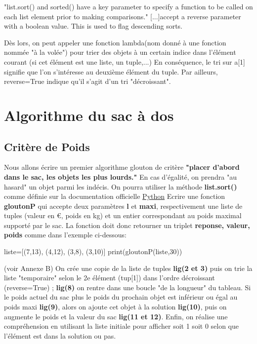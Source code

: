 \documentclass[a4paper,11,answers
]{exam}
\begin{document}
\begin{questions}
\begin{solution}
 "list.sort() and sorted() have a key parameter to specify a function to be called on each list element prior to making comparisons." [...]accept a reverse parameter with a boolean value. This is used to flag descending sorts.\newline

 Dès lors, on peut appeler une fonction lambda(nom donné à une fonction nommée "à la volée") pour trier des objets à un certain indice dans l’élément courant (si cet élément est une liste, un tuple,...) En conséquence, le tri sur a[1] signifie que l’on s’intéresse au deuxième élément du tuple. Par ailleurs, reverse=True indique qu’il s’agit d’un tri "décroissant".

\end{solution}
\section{Algorithme du sac à dos}
\subsection{Critère de Poids} 
Nous allons écrire un premier algorithme glouton de critère \textbf{"placer d'abord dans le sac, les objets les plus lourds."} En cas d'égalité, on prendra "au hasard" un objet parmi les indécis. On pourra utiliser la méthode \textbf{list.sort()} comme définie sur la documentation officielle \href{https://docs.python.org/fr/3/howto/sorting.html}{Python}
\question Ecrire une fonction \textbf{gloutonP} qui accepte deux paramètres \textbf{l} et \textbf{maxi}, respectivement une liste de tuples (valeur en €, poids en kg) et un entier correspondant au poids maximal supporté par le sac. La fonction doit donc retourner un triplet \textbf{reponse, valeur, poids} comme dans l'exemple ci-dessous:
 \vspace{5mm}
\begin{tcolorbox}[enhanced,attach boxed title to top center={yshift=-3mm,yshifttext=-1mm},
  colback=green!5!white,colframe=green!75!black,colbacktitle=green!25!black,
  title=Console Python, fonttitle=\bfseries,
  boxed title style={size=small,colframe=blue!25!black} ]
\begin{pyconsole}
liste=[(7,13), (4,12), (3,8), (3,10)]
print(gloutonP(liste,30))
\end{pyconsole}
\end{tcolorbox}
 \vspace{5mm}
\begin{solution}
(voir Annexe B) On crée une copie de la liste de tuples \textbf{lig(2 et 3)}  puis on trie la liste "temporaire" selon le 2e élément (tup[1]) dans l'ordre décroissant (reverse=True) ;  \textbf{lig(8)} on rentre dans une boucle "de la longueur" du tableau. Si le poids actuel du sac plus le poids du prochain objet est inférieur ou égal au poids maxi \textbf{lig(9)}, alors on ajoute cet objet à la solution \textbf{lig(10)}, puis on augmente le poids et la valeur du sac \textbf{lig(11 et 12)}. Enfin, on réalise une compréhension en utilisant la liste initiale pour afficher soit 1 soit 0 selon que l'élément est dans la solution ou pas.
\end{solution}


\end{questions}
\end{document}
